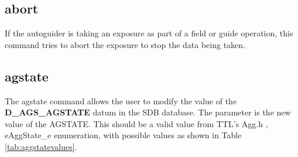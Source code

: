 \documentclass[10pt,a4paper]{article}
\begin{document}
\subsection{abort}

If the autoguider is taking an exposure as part of a field or guide operation, this command tries to abort the exposure
to stop the data being taken.

\subsection{agstate}

The agstate command allows the user to modify the value of the {\bf D\_AGS\_AGSTATE} datum in the SDB database. The parameter is the new value of the AGSTATE.  This should be a valid value from TTL's Agg.h , eAggState\_e enumeration, with possible values as shown in Table \ref{tab:aggstatevalues}.
\end{document}
